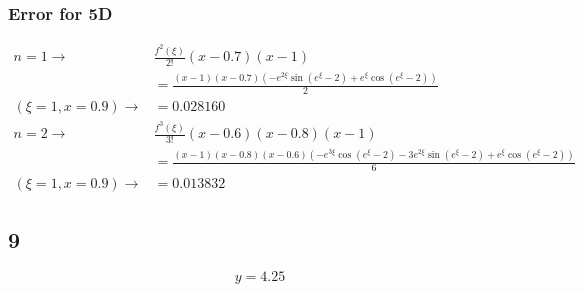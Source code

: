 \documentclass{oisinclass}
\begin{document}
\subsubsection*{Error for 5D}
\begin{align*}
	n = 1 \rightarrow                         & \frac{f^2(\xi)}{2!}(x-0.7)(x-1)                                                                                                                                                                                           \\
	                                          & = \frac{\left(x - 1\right) \left(x - 0.7\right) \left(- e^{2 \xi} \sin{\left(e^{\xi} - 2 \right)} + e^{\xi} \cos{\left(e^{\xi} - 2 \right)}\right)}{2}                                                                    \\
	\left(\xi = 1, x = 0.9\right) \rightarrow & = 0.028160                                                                                                                                                                                                                \\
	n = 2 \rightarrow                         & \frac{f^3(\xi)}{3!}(x-0.6)(x-0.8)(x-1)                                                                                                                                                                                    \\
	                                          & = \frac{\left(x - 1\right) \left(x - 0.8\right) \left(x - 0.6\right) \left(- e^{3 \xi} \cos{\left(e^{\xi} - 2 \right)} - 3 e^{2 \xi} \sin{\left(e^{\xi} - 2 \right)} + e^{\xi} \cos{\left(e^{\xi} - 2 \right)}\right)}{6} \\
	\left(\xi = 1, x = 0.9\right) \rightarrow & = 0.013832
\end{align*}
\subsection*{9}
\[y = 4.25\]
\end{document}
